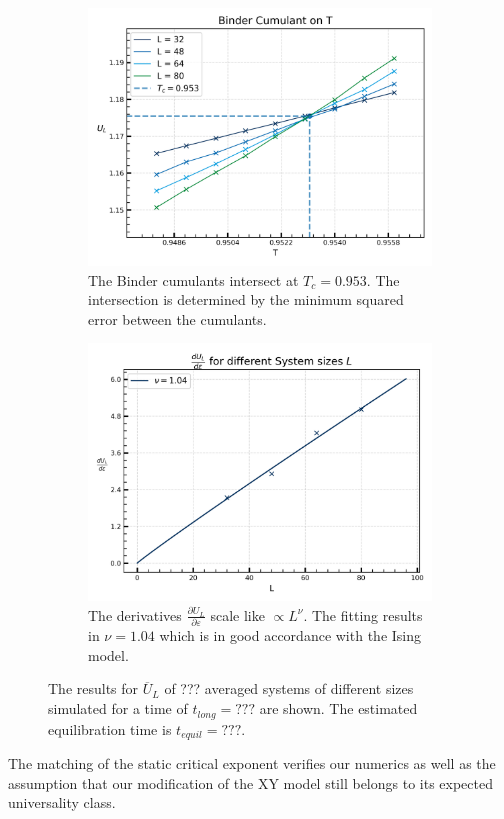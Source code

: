 	\begin{figure}[htp]
		\begin{subfigure}{0.5\textwidth}
			\centering
			\includegraphics[width=0.8\linewidth]{graphics/cum_time_avg.png}
			\caption{The Binder cumulants intersect at $T_c =	0.953$. The intersection is determined by the minimum squared error between the cumulants.}
		\end{subfigure}
		\begin{subfigure}{0.5\textwidth}
			\centering
			\includegraphics[width=0.8\linewidth]{graphics/critical_exponent_time_avg.png}
			\caption{The derivatives $\frac{\partial U_L}{\partial \varepsilon}$ scale like $\propto L^\nu$. The fitting results in $\nu = 1.04$ which is in good accordance with the Ising model.}
		\end{subfigure}
		\caption{The results for $\overline{U}_L$ of ??? averaged systems of different sizes simulated for a time of $t_{long} =	??? $ are shown. The estimated equilibration time is $t_{equil} =	??? $.}
		\label{Fig::Binder-Cum-Result}
	\end{figure}  
	The matching of the static critical exponent verifies our numerics as well as the assumption that our modification of the XY model still belongs to its expected universality class.

